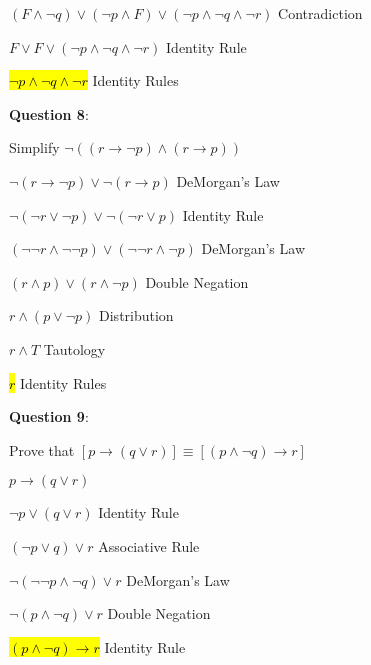 \documentclass{article} %
\newcommand{\question}[2][]{\begin{flushleft}
        \textbf{Question #1}: \textit{#2}

\end{flushleft}}
\begin{document}
        \tabto{0.98cm}$(F \land \neg q) \lor (\neg p \land F) \lor (\neg p \land \neg q \land \neg r)$ \tabto*{9cm} Contradiction
        
        \tabto{0.98cm}$F \lor F \lor (\neg p \land \neg q \land \neg r)$ \tabto*{9cm} Identity Rule

        \tabto{0.98cm}\hl{$\neg p \land \neg q \land \neg r$} \tabto*{9cm} Identity Rules

    \question[8]{}

        Simplify $\neg ((r \rightarrow \neg p) \land (r \rightarrow p))$

        \hspace*{0.05cm}

        $\neg(r \rightarrow \neg p) \lor \neg(r \rightarrow p) $ \tabto*{5cm} DeMorgan's Law

        $\neg(\neg r \lor \neg p) \lor \neg( \neg r \lor p) $ \tabto*{5cm} Identity Rule

        $(\neg \neg r \land \neg \neg p) \lor (\neg \neg r \land \neg p) $ \tabto*{5cm} DeMorgan's Law

        $(r \land p) \lor (r \land \neg p)$ \tabto*{5cm} Double Negation \hspace*{2cm}

        $r \land (p \lor \neg p)$ \tabto*{5cm} Distribution

        $r \land T$ \tabto*{5cm} Tautology

        \hl{$r$} \tabto*{5cm} Identity Rules

    \newpage
    \question[9]{}

        Prove that $[p \rightarrow (q \lor r)] \equiv [(p \land \neg q) \rightarrow r]$

        \hspace{0cm}

        $p \rightarrow (q \lor r)$

        $\neg p \lor (q \lor r)$ \tabto*{3.5cm} Identity Rule
        
        $(\neg p \lor q) \lor r$ \tabto*{3.5cm} Associative Rule

        $\neg (\neg \neg p \land \neg q) \lor r$ \tabto*{3.5cm} DeMorgan's Law

        $\neg (p \land \neg q) \lor r$ \tabto*{3.5cm} Double Negation

        \hl{$(p \land \neg q) \rightarrow r$} \tabto*{3.5cm} Identity Rule

        \hspace{0cm}
\end{document}

